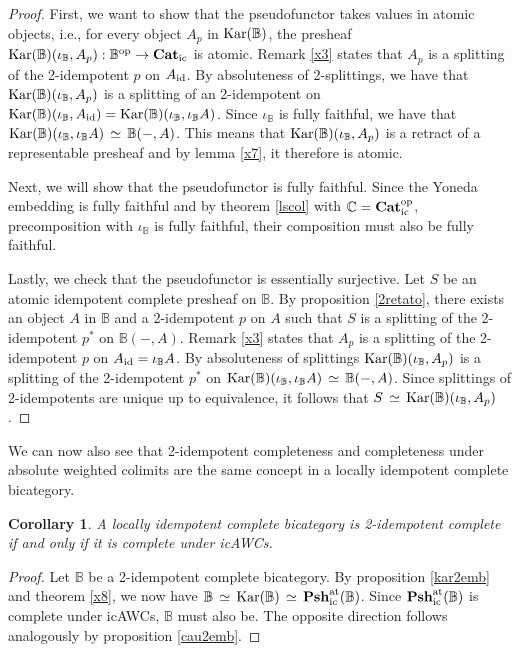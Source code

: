 \documentclass[12pt,oneside,reqno,a4paper]{article}
\newtheorem{corollary}[theorem]{Corollary}
\theoremstyle{definition}
\newcommand{\op}{^\textup{op}}
\newcommand{\Catic}{\textbf{\textup{Cat}}_\textup{ic}}
\newcommand{\Pshicat}[1]{\textbf{\textup{Psh}}^\textup{at}_\textup{ic}(#1)}
\newcommand{\Kar}[1]{\textup{Kar}(#1)}
\renewcommand{\equiv}{\,\simeq\,}
\newcommand{\id}{\textup{id}}
\newcommand{\bB}{\mathbb{B}}
\newcommand{\bC}{\mathbb{C}}
\begin{document}
\begin{proof}
First, we want to show that the pseudofunctor takes values in atomic objects, i.e., for every object $A_p$ in $\Kar{\bB}$, the presheaf $\Kar{\bB}(\iota_\bB,A_p):\bB\op\to\Catic$ is atomic. Remark \ref{x3} states that $A_p$ is a splitting of the 2-idempotent $p$ on $A_{\id}$. By absoluteness of 2-splittings, we have that $\Kar{\bB}(\iota_\bB,A_p)$ is a splitting of an 2-idempotent on $\Kar{\bB}(\iota_\bB,A_{\id})=\Kar{\bB}(\iota_\bB,\iota_\bB A)$. Since $\iota_\bB$ is fully faithful, we have that $\Kar{\bB}(\iota_\bB,\iota_\bB A)\equiv\bB(-,A)$. This means that $\Kar{\bB}(\iota_\bB,A_p)$ is a retract of a representable presheaf and by lemma \ref{x7}, it therefore is atomic.

Next, we will show that the pseudofunctor is fully faithful. Since the Yoneda embedding is fully faithful and by theorem \ref{lscol} with $\bC=\Catic\op$, precomposition with $\iota_\bB$ is fully faithful, their composition must also be fully faithful.

Lastly, we check that the pseudofunctor is essentially surjective. Let $S$ be an atomic idempotent complete presheaf on $\bB$. By proposition \ref{2retato}, there exists an object $A$ in $\bB$ and a 2-idempotent $p$ on $A$ such that $S$ is a splitting of the 2-idempotent $p^*$ on $\bB(-,A)$. Remark \ref{x3} states that $A_p$ is a splitting of the 2-idempotent $p$ on $A_{\id}=\iota_\bB A$. By absoluteness of splittings $\Kar{\bB}(\iota_\bB,A_p)$ is a splitting of the 2-idempotent $p^*$ on $\Kar{\bB}(\iota_\bB,\iota_\bB A)\equiv \bB(-,A)$. Since splittings of 2-idempotents are unique up to equivalence, it follows that $S\equiv \Kar{\bB}(\iota_\bB,A_p)$.
\end{proof}

We can now also see that 2-idempotent completeness and completeness under absolute weighted colimits are the same concept in a locally idempotent complete bicategory.

\begin{corollary} \label{x10}
A locally idempotent complete bicategory is 2-idempotent complete if and only if it is complete under icAWCs.
\end{corollary}

\begin{proof}
Let $\bB$ be a 2-idempotent complete bicategory. By proposition \ref{kar2emb} and theorem \ref{x8}, we now have $\bB\equiv \Kar{\bB}\equiv \Pshicat{\bB}$. Since $\Pshicat{\bB}$ is complete under icAWCs, $\bB$ must also be. The opposite direction follows analogously by proposition \ref{cau2emb}.
\end{proof}
\appendix
\end{document}
